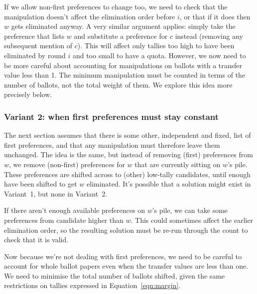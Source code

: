 \documentclass[10pt,a4paper]{article}
\begin{document}
If we allow non-first preferences to change too, we need to check that the manipulation doesn't affect the elimination order before $i$, or that if it does then $w$ gets eliminated anyway.  A very similar argument applies: simply take the preference that lists $w$ and substitute a preference for $c$ instead (removing any subsequent mention of $c$).  This will affect only tallies too high to have been eliminated by round $i$ and too small to have a quota.  However, we now need to be more careful about accounting for manipulations on ballots with a transfer value less than 1.  The minimum manipulation must be counted in terms of the number of ballots, not the total weight of them.  We explore this idea more precisely below.

\subsubsection{Variant 2: when first preferences must stay constant}
The next section assumes that there is some other, independent and fixed, list of first preferences, and that any manipulation must therefore leave them unchanged.  The idea is the same, but instead of removing (first) preferences from $w$, we remove (non-first) preferences for $w$ that are currently sitting on $w$'s pile.  These preferences are shifted across to (other) low-tally candidates, until enough have been shifted to get $w$ eliminated.  It's possible that a solution might exist in Variant~1, but none in Variant~2.

If there aren't enough available preferences on $w$'s pile, we can take some preferences from candidate higher than $w$.  This could sometimes affect the earlier elimination order, so the resulting solution must be re-run through the count to check that it is valid.

Now because we're not dealing with first preferences, we need to be careful to account for whole ballot papers even when the transfer values are less than one.  We need to minimise the total number of ballots shifted, given the same restrictions on tallies expressed in Equation~\ref{eqn:margin}.
\end{document}
